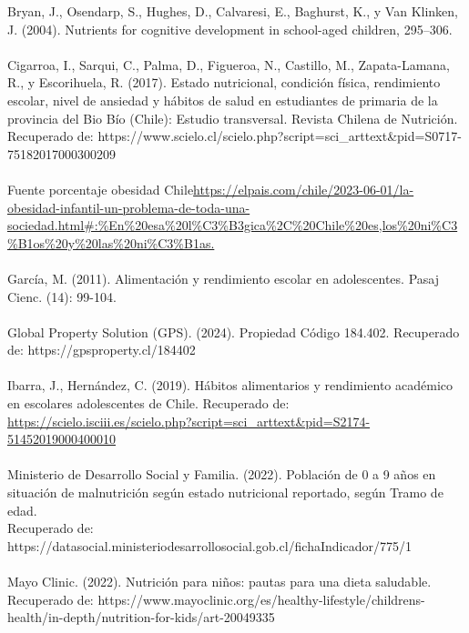 \documentclass[letterpaper]{article}
\begin{document}
Bryan, J., Osendarp, S., Hughes, D., Calvaresi, E., Baghurst, K., y Van Klinken, J. (2004). Nutrients for cognitive development in school-aged children, 295–306. 
\\
\\

Cigarroa, I., Sarqui, C., Palma, D., Figueroa, N., Castillo, M., Zapata-Lamana, R., y Escorihuela, R. (2017). Estado nutricional, condición física, rendimiento escolar, nivel de ansiedad y hábitos de salud en estudiantes de primaria de la provincia del Bio Bío (Chile): Estudio transversal. Revista Chilena de Nutrición. Recuperado de: https://www.scielo.cl/scielo.php?script=sci\_arttext\&pid=S0717-75182017000300209 
\\
\\

Fuente porcentaje obesidad Chile\url{https://elpais.com/chile/2023-06-01/la-obesidad-infantil-un-problema-de-toda-una-sociedad.html\#:\%En\%20esa\%20l\%C3\%B3gica\%2C\%20Chile\%20es,los\%20ni\%C3\%B1os\%20y\%20las\%20ni\%C3\%B1as.}
\\
\\

García, M. (2011). Alimentación y rendimiento escolar en adolescentes. Pasaj Cienc. (14): 99-104.
\\
\\

Global Property Solution (GPS). (2024). Propiedad Código 184.402. Recuperado de: https://gpsproperty.cl/184402
\\
\\

Ibarra, J., Hernández, C. (2019). Hábitos alimentarios y rendimiento académico en escolares adolescentes de Chile. Recuperado de: \url{https://scielo.isciii.es/scielo.php?script=sci\_arttext\&pid=S2174-51452019000400010}   
\\
\\  

Ministerio de Desarrollo Social y Familia. (2022). Población de 0 a 9 años en situación de malnutrición según estado nutricional reportado, según Tramo de edad. \\Recuperado de: https://datasocial.ministeriodesarrollosocial.gob.cl/fichaIndicador/775/1
\\
\\

Mayo Clinic. (2022). Nutrición para niños: pautas para una dieta saludable. Recuperado de: https://www.mayoclinic.org/es/healthy-lifestyle/childrens-health/in-depth/nutrition-for-kids/art-20049335 
\\
\\
\end{document}
